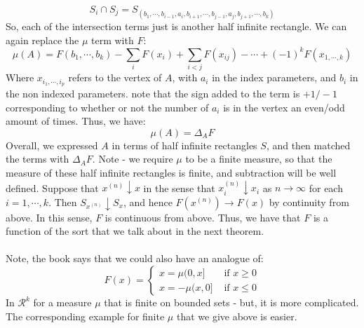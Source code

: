 \documentclass[12pt,a4paper]{article}
\newcommand{\1}[1]{\mathbbm{1}\left\{ #1 \right\}}
\newcommand{\rcal}{\mathcal{R}}
\begin{document}
$$
	S_i \cap S_j = S_{(b_1,\cdots,b_{i-1},a_i,b_{i+1},\cdots,b_{j-1},a_j,b_{j+1},\cdots,b_k)}
$$
So, each of the intersection terms just is another half infinite rectangle. We can again replace the $\mu$ term with $F$:
$$
	\mu(A) = F(b_1, \cdots, b_k) - \sum_i F(x_i) + \sum_{i < j} F(x_{ij}) - \cdots + (-1)^k F(x_{1,\cdots,k})
$$
Where $x_{i_1,\cdots,i_p}$ refers to the vertex of $A$, with $a_i$ in the index parameters, and $b_i$ in the non indexed parameters. note that the sign added to the term is $+1/-1$ corresponding to whether or not the number of $a_i$ is in the vertex an even/odd amount of times. Thus, we have:
$$
	\mu(A) = \Delta_A F
$$
Overall, we expressed $A$ in terms of half infinite rectangles $S$, and then matched the terms with $\Delta_AF$. Note - we require $\mu$ to be a finite measure, so that the measure of these half infinite rectangles is finite, and subtraction will be well defined. Suppose that $x^{(n)} \downarrow x$ in the sense that $x_i^{(n)} \downarrow x_i$ as $n \to \infty$ for each $i = 1, \cdots, k$. Then $S_{x^{(n)}} \downarrow S_x$, and hence $F(x^{(n)}) \to F(x)$ by continuity from above. In this sense, $F$ is continuous from above. Thus, we have that $F$ is a function of the sort that we talk about in the next theorem.
\\\\
Note, the book says that we could also have an analogue of:
$$
	F(x) =
	\begin{cases}
		x = \mu(0,x] & \text{ if $x \geq 0$}\\
		x = -\mu(x,0] & \text{ if $x \leq 0$}
	\end{cases}
$$
In $\rcal^k$ for a measure $\mu$ that is finite on bounded sets - but, it is more complicated. The corresponding example for finite $\mu$ that we give above is easier.
\end{document}
